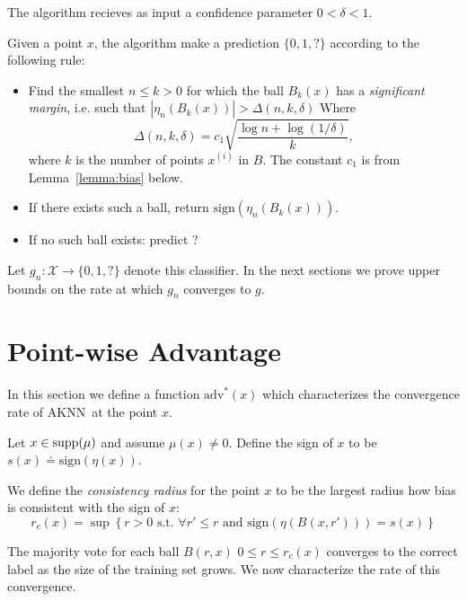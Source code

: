 \documentclass{article}
\def\X{{\mathcal X}}
\def\supp{{\rm supp}}
\newcommand{\sign}{\mbox{sign}}
\newcommand{\algname}{\textsc{AKNN}}
\newcommand{\comment}[3]{}  %
\newcommand{\shay}[1]{\comment{purple}{Shay}{#1}}
\newcommand{\yoav}[1]{\comment{green}{Yoav}{#1}}
\begin{document}
The algorithm recieves as input a confidence parameter $0 < \delta <1$.

Given a point $x$, the algorithm make a prediction $\{0,1,?\}$  according to the following rule:

\begin{itemize}
\item Find the smallest $n \leq k>0$ for which the ball $B_k(x)$ has a
  {\em significant margin}, i.e. such that $\left|\eta_n(B_k(x))\right| > \Delta(n,k,\delta)$
  Where
  $$ \Delta(n,k,\delta) = c_1 \sqrt{\frac{\log n + \log (1/\delta)}{k}}, $$
where $k$ is the number of points $x^{(i)}$ in $B$. The constant $c_1$ is from Lemma~\ref{lemma:bias} below.
\shay{I presume $d_0$ denotes the VC dimension of the family of all balls? 
$d_0$ should be set to $1$ in the case of the ``expected-case'' analysis}
\yoav{I suggest we push $d_0$ to the end of the paper}
\item If there exists such a ball, return $\sign(\eta_n(B_k(x)))$.
\item If no such ball exists: predict ?
\end{itemize}
Let $g_n: \X \rightarrow \{0,1,?\}$ denote this classifier.
In the next sections we prove upper bounds on the rate at which  $g_n$ converges to $g$.

\section{Point-wise Advantage}

\newcommand{\advantage}{\mbox{adv}}
\newcommand{\opt}{\mbox{adv}^*}
\newcommand{\eopt}{\epsilon \mbox{-Opt}}

In this section we define a  function $\opt(x)$ which
characterizes the convergence rate of \algname\ at the point $x$.

Let $x \in \supp(\mu)$ and assume $\mu(x) \neq 0$. Define the sign of $x$ to be $s(x) \doteq \sign(\eta(x))$.

\newcommand{\rconsist}{r_c}
We define the {\em consistency radius} for the point $x$ to be the largest radius how bias is consistent with the sign of $x$:
\begin{equation}
\rconsist(x) = \sup \left\{ r>0 \mbox{ s.t. } \forall r' \leq r \mbox{ and } \sign(\eta(B(x,r')))
  =  s(x) \right\}
\end{equation}

The majority vote for each ball $B(r,x)$ $0 \leq r \leq \rconsist(x)$ converges to the correct label 
as the size of the training set grows. We now characterize the rate of this convergence.
\end{document}
